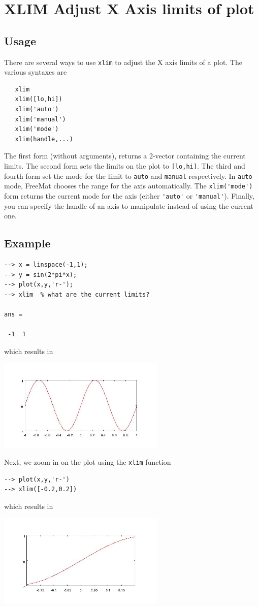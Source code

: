 \section{XLIM Adjust X Axis limits of plot}

\subsection{Usage}

There are several ways to use \verb|xlim| to adjust the X axis limits of
a plot.  The various syntaxes are
\begin{verbatim}
   xlim
   xlim([lo,hi])   
   xlim('auto')
   xlim('manual')
   xlim('mode')
   xlim(handle,...)
\end{verbatim}
The first form (without arguments), returns a 2-vector containing the
current limits.  The second form sets the limits on the plot to \verb|[lo,hi]|.
The third and fourth form set the mode for the limit to \verb|auto| and \verb|manual|
respectively.  In \verb|auto| mode, FreeMat chooses the range for the axis 
automatically.  The \verb|xlim('mode')| form returns the current mode for the axis
(either \verb|'auto'| or \verb|'manual'|).  Finally, you can specify the handle of an
axis to manipulate instead of using the current one.
\subsection{Example}

\begin{verbatim}
--> x = linspace(-1,1);
--> y = sin(2*pi*x);
--> plot(x,y,'r-');
--> xlim  % what are the current limits?

ans = 

 -1  1 
\end{verbatim}
which results in


\centerline{\includegraphics[width=8cm]{xlim1}}

Next, we zoom in on the plot using the \verb|xlim| function
\begin{verbatim}
--> plot(x,y,'r-')
--> xlim([-0.2,0.2])
\end{verbatim}
which results in


\centerline{\includegraphics[width=8cm]{xlim2}}

